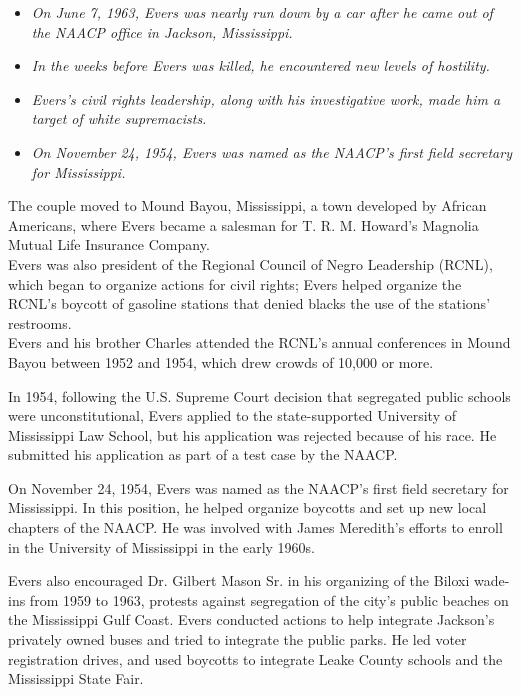 \begin{itemize}
\item
  \emph{On June 7, 1963, Evers was nearly run down by a car after he
  came out of the NAACP office in Jackson, Mississippi.}
\item
  \emph{In the weeks before Evers was killed, he encountered new levels
  of hostility.}
\item
  \emph{Evers's civil rights leadership, along with his investigative
  work, made him a target of white supremacists.}
\item
  \emph{On November 24, 1954, Evers was named as the NAACP's first field
  secretary for Mississippi.}
\end{itemize}

The couple moved to Mound Bayou, Mississippi, a town developed by
African Americans, where Evers became a salesman for T. R. M. Howard's
Magnolia Mutual Life Insurance Company.\\
Evers was also president of the Regional Council of Negro Leadership
(RCNL), which began to organize actions for civil rights; Evers helped
organize the RCNL's boycott of gasoline stations that denied blacks the
use of the stations' restrooms.\\
Evers and his brother Charles attended the RCNL's annual conferences in
Mound Bayou between 1952 and 1954, which drew crowds of 10,000 or more.

In 1954, following the U.S. Supreme Court decision that segregated
public schools were unconstitutional, Evers applied to the
state-supported University of Mississippi Law School, but his
application was rejected because of his race. He submitted his
application as part of a test case by the NAACP.

On November 24, 1954, Evers was named as the NAACP's first field
secretary for Mississippi. In this position, he helped organize boycotts
and set up new local chapters of the NAACP. He was involved with James
Meredith's efforts to enroll in the University of Mississippi in the
early 1960s.

Evers also encouraged Dr. Gilbert Mason Sr. in his organizing of the
Biloxi wade-ins from 1959 to 1963, protests against segregation of the
city's public beaches on the Mississippi Gulf Coast. Evers conducted
actions to help integrate Jackson's privately owned buses and tried to
integrate the public parks. He led voter registration drives, and used
boycotts to integrate Leake County schools and the Mississippi State
Fair.


